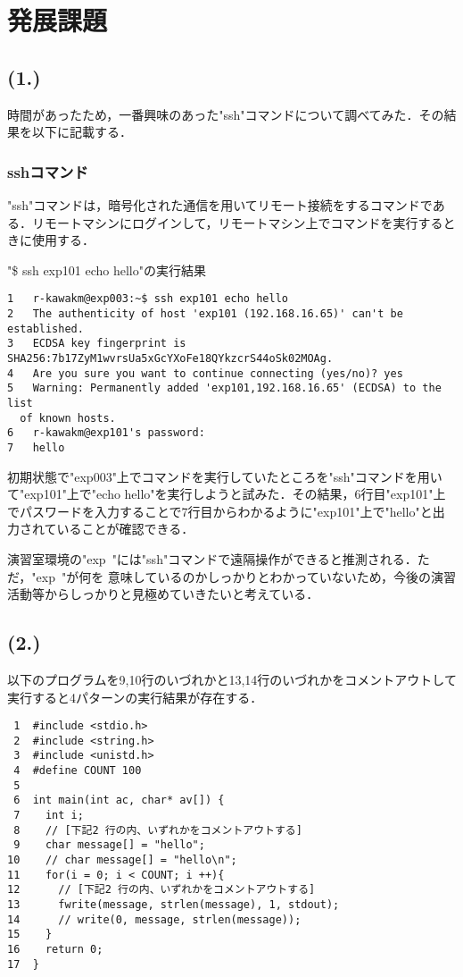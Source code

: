 \documentclass[a4j]{jarticle}
\newenvironment{bit}{\begin{breakitembox}}{\end{breakitembox}} %
\begin{document}
\section{発展課題}

\subsection{(1.)}

時間があったため，一番興味のあった"ssh"コマンドについて調べてみた．その結果を以下に記載する．

\subsubsection{sshコマンド}

"ssh"コマンドは，暗号化された通信を用いてリモート接続をするコマンドである．リモートマシンにログインして，リモートマシン上でコマンドを実行するときに使用する．

\begin{bit}[l]{"\$ ssh exp101 echo hello"の実行結果}
\small{
\begin{verbatim}
1	r-kawakm@exp003:~$ ssh exp101 echo hello
2	The authenticity of host 'exp101 (192.168.16.65)' can't be established.
3	ECDSA key fingerprint is SHA256:7b17ZyM1wvrsUa5xGcYXoFe18QYkzcrS44oSk02MOAg.
4	Are you sure you want to continue connecting (yes/no)? yes
5	Warning: Permanently added 'exp101,192.168.16.65' (ECDSA) to the list
  of known hosts.
6	r-kawakm@exp101's password:
7	hello
\end{verbatim}
}
\end{bit}

初期状態で"exp003"上でコマンドを実行していたところを"ssh"コマンドを用いて"exp101"上で"echo hello"を実行しようと試みた．その結果，6行目"exp101"上でパスワードを入力することで7行目からわかるように"exp101"上で"hello"と出力されていることが確認できる．

演習室環境の"exp~"には"ssh"コマンドで遠隔操作ができると推測される．ただ，"exp~"が何を
意味しているのかしっかりとわかっていないため，今後の演習活動等からしっかりと見極めていきたいと考えている．

\subsection{(2.)}

以下のプログラムを9,10行のいづれかと13,14行のいづれかをコメントアウトして実行すると4パターンの実行結果が存在する．

\begin{bit}[l]{}
\small{
\begin{verbatim}
 1	#include <stdio.h>
 2	#include <string.h>
 3	#include <unistd.h>
 4	#define COUNT 100
 5
 6	int main(int ac, char* av[]) {
 7	  int i;
 8	  // [下記2 行の内、いずれかをコメントアウトする]
 9	  char message[] = "hello";
10	  // char message[] = "hello\n";
11	  for(i = 0; i < COUNT; i ++){
12	    // [下記2 行の内、いずれかをコメントアウトする]
13	    fwrite(message, strlen(message), 1, stdout);
14	    // write(0, message, strlen(message));
15	  }
16	  return 0;
17	}
\end{verbatim}
}
\end{bit}
\end{document}
